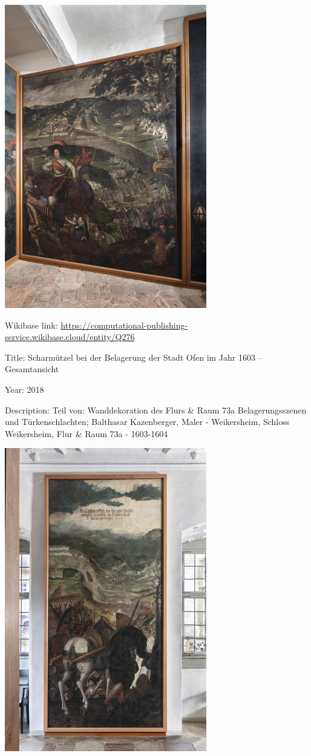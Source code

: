 \documentclass[
  letterpaper,
]{book}
\begin{document}
\includegraphics{paintings_files/figure-pdf/cell-3-output-42.png}

Wikibase link:
\url{https://computational-publishing-service.wikibase.cloud/entity/Q276}

Title: Scharmützel bei der Belagerung der Stadt Ofen im Jahr 1603 --
Gesamtansicht

Year: 2018

Description: Teil von: Wanddekoration des Flurs \& Raum 73a
Belagerungsszenen und Türkenschlachten; Balthasar Kazenberger, Maler -
Weikersheim, Schloss Weikersheim, Flur \& Raum 73a - 1603-1604

\includegraphics{paintings_files/figure-pdf/cell-3-output-44.png}
\end{document}
